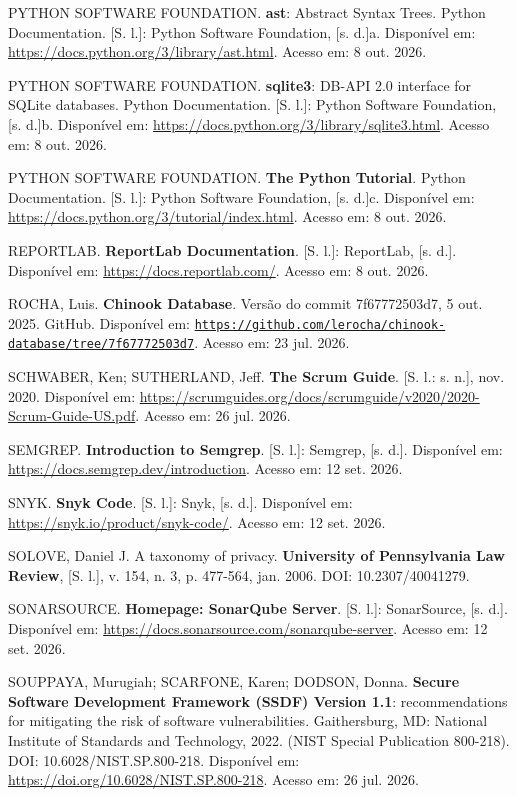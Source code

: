 \documentclass[12pt,a4paper,oneside]{report}
\newcommand{\tituloref}[1]{\textbf{#1}}
\begin{document}
PYTHON SOFTWARE FOUNDATION. \tituloref{ast}: Abstract Syntax Trees. Python Documentation. [S. l.]: Python Software Foundation, [s. d.]a. Disponível em: \url{https://docs.python.org/3/library/ast.html}. Acesso em: 8 out. 2026.

PYTHON SOFTWARE FOUNDATION. \tituloref{sqlite3}: DB-API 2.0 interface for SQLite databases. Python Documentation. [S. l.]: Python Software Foundation, [s. d.]b. Disponível em: \url{https://docs.python.org/3/library/sqlite3.html}. Acesso em: 8 out. 2026.

PYTHON SOFTWARE FOUNDATION. \tituloref{The Python Tutorial}. Python Documentation. [S. l.]: Python Software Foundation, [s. d.]c. Disponível em: \url{https://docs.python.org/3/tutorial/index.html}. Acesso em: 8 out. 2026.

REPORTLAB. \tituloref{ReportLab Documentation}. [S. l.]: ReportLab, [s. d.]. Disponível em: \url{https://docs.reportlab.com/}. Acesso em: 8 out. 2026.

ROCHA, Luis. \tituloref{Chinook Database}. Versão do commit 7f67772503d7, 5 out. 2025. GitHub. Disponível em: \href{https://github.com/lerocha/chinook-database/tree/7f67772503d71ba90f19283c38e93923addb43fa}{\nolinkurl{https://github.com/lerocha/chinook-database/tree/7f67772503d7}}. Acesso em: 23 jul. 2026.

SCHWABER, Ken; SUTHERLAND, Jeff. \tituloref{The Scrum Guide}. [S. l.: s. n.], nov. 2020. Disponível em: \url{https://scrumguides.org/docs/scrumguide/v2020/2020-Scrum-Guide-US.pdf}. Acesso em: 26 jul. 2026.

SEMGREP. \tituloref{Introduction to Semgrep}. [S. l.]: Semgrep, [s. d.]. Disponível em: \url{https://docs.semgrep.dev/introduction}. Acesso em: 12 set. 2026.

SNYK. \tituloref{Snyk Code}. [S. l.]: Snyk, [s. d.]. Disponível em: \url{https://snyk.io/product/snyk-code/}. Acesso em: 12 set. 2026.

SOLOVE, Daniel J. A taxonomy of privacy. \tituloref{University of Pennsylvania Law Review}, [S. l.], v. 154, n. 3, p. 477-564, jan. 2006. DOI: 10.2307/40041279.

SONARSOURCE. \tituloref{Homepage: SonarQube Server}. [S. l.]: SonarSource, [s. d.]. Disponível em: \url{https://docs.sonarsource.com/sonarqube-server}. Acesso em: 12 set. 2026.

SOUPPAYA, Murugiah; SCARFONE, Karen; DODSON, Donna. \tituloref{Secure Software Development Framework (SSDF) Version 1.1}: recommendations for mitigating the risk of software vulnerabilities. Gaithersburg, MD: National Institute of Standards and Technology, 2022. (NIST Special Publication 800-218). DOI: 10.6028/NIST.SP.800-218. Disponível em: \url{https://doi.org/10.6028/NIST.SP.800-218}. Acesso em: 26 jul. 2026.
\end{document}
